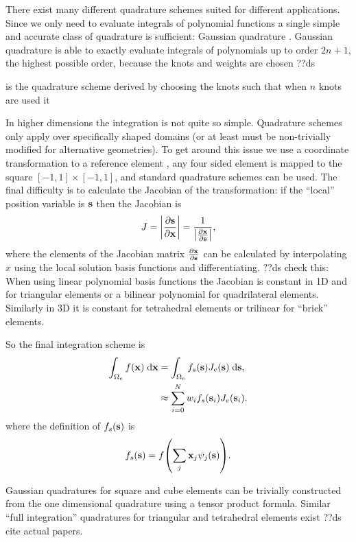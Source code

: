 There exist many different quadrature schemes suited for different applications.
Since we only need to evaluate integrals of polynomial functions a single simple and accurate class of quadrature is sufficient: Gaussian quadrature \cite[492]{Kincaid2002}.
Gaussian quadrature is able to exactly evaluate integrals of polynomials up to order $2n + 1$, the highest possible order, because the knots and weights are chosen ??ds

is the quadrature scheme derived by choosing the knots such that when $n$ knots are used it 

In higher dimensions the integration is not quite so simple.
Quadrature schemes only apply over specifically shaped domains (or at least must be non-trivially modified for alternative geometries).
To get around this issue we use a coordinate transformation to a reference element \cite[29]{HowardElmanDavidSilvester2006}, \eg any four sided element is mapped to the square $[-1, 1] \times [-1, 1]$, and standard quadrature schemes can be used.
The final difficulty is to calculate the Jacobian of the transformation: if the ``local'' position variable is $\sv$ then the Jacobian is
\begin{equation}
  J = \abs{ \pd{\sv}{\xv}} = \frac{1}{\abs{\pd{\xv}{\sv}}},
\end{equation}
where the elements of the Jacobian matrix $\pd{\xv}{\sv}$ can be calculated by interpolating $x$ using the local solution basis functions and differentiating.
??ds check this: When using linear polynomial basis functions the Jacobian is constant in 1D and for triangular elements or a bilinear polynomial for quadrilateral elements. 
Similarly in 3D it is constant for tetrahedral elements or trilinear for ``brick'' elements.

So the final integration scheme is
\begin{equation}
  \begin{aligned}
    \intdx[\magd_e]{f(\xv)} &= \intds[\magd_e]{f_s(\sv) J_e(\sv)}, \\
    &\approx  \sum_{i=0}^N w_i f_s(\sv_i) J_e(\sv_i).
  \end{aligned}
\end{equation}
where the definition of $f_s(\sv)$ is
\begin{equation}
  f_s(\sv) = f\bigb{\sum_j  \xv_j \sbf_j(\sv)}.
\end{equation}

Gaussian quadratures for square and cube elements can be trivially constructed from the one dimensional quadrature using a tensor product formula.
Similar ``full integration'' quadratures for triangular and tetrahedral elements exist \eg \cite{oomph-lib-integral.cc} ??ds cite actual papers.




